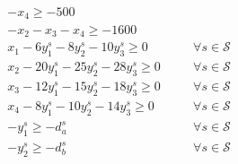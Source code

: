 \documentclass[7pt]{article}
\begin{document}
\begin{align*}
     & -x_4 \geq -500                                                                                                                                                                                                                                                                                                              \\
     & -x_2 - x_3 - x_4 \geq -1600                                                                                                                                                                                                                                                                                                 \\
     & x_1 - 6 y_1^s - 8 y_2^s - 10 y_3^s \geq 0 \quad                                                                                                                                                                                                                                              &  & \forall s \in \mathcal{S} \\
     & x_2 - 20 y_1^s - 25 y_2^s - 28 y_3^s \geq 0 \quad                                                                                                                                                                                                                                            &  & \forall s \in \mathcal{S} \\
     & x_3 - 12 y_1^s - 15 y_2^s - 18 y_3^s \geq 0 \quad                                                                                                                                                                                                                                            &  & \forall s \in \mathcal{S} \\
     & x_4 - 8 y_1^s - 10 y_2^s - 14 y_3^s \geq 0 \quad                                                                                                                                                                                                                                             &  & \forall s \in \mathcal{S} \\
     & -y_1^s \geq -d_a^s                                                                                                                                                                                                                                                                           &  & \forall s \in \mathcal{S} \\
     & -y_2^s \geq -d_b^s                                                                                                                                                                                                                                                                           &  & \forall s \in \mathcal{S} \\

\end{align*}
\end{document}
